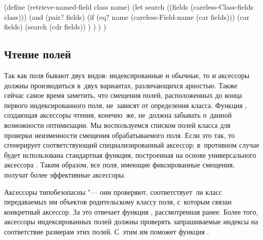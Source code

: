 \begin{code:lisp}
(define (retrieve-named-field class name)
  (let search ((fields (careless-Class-fields class)))
    (and (pair? fields)
         (if (eq? name (careless-Field-name (car fields)))
             (car fields)
             (search (cdr fields)) ) ) ) )
\end{code:lisp}


\subsection{Чтение полей}\label{objects/accomp/ssect:read}

Так как поля бывают двух видов: индексированные и обычные, то и аксессоры должны
производиться в~двух вариантах, различающихся арностью. Также сейчас самое время
заметить, что смещения полей, расположенных до конца первого индексированного
поля, не~зависят от определения класса. Функция , создающая
аксессоры чтения, конечно~же, не~должна забывать о~данной возможности
оптимизации. Мы воспользуемся списком полей класса для проверки неизменности
смещения обрабатываемого поля. Если это так, то  сгенерирует
соответствующий специализированный аксессор; в~противном случае будет
использована стандартная функция, построенная на основе универсального аксессора
. Таким образом, все поля, имеющие фиксированные смещения,
получат более эффективные аксессоры.

Аксессоры типобезопасны "--- они проверяют, соответствует~ли класс передаваемых
им объектов родительскому классу поля, с~которым связан конкретный аксессор. За
это отвечает функция , рассмотренная ранее. Более
того, аксессоры индексированных полей должны проверять запрашиваемые индексы на
соответствие размерам этих полей. С~этим им поможет функция
.

